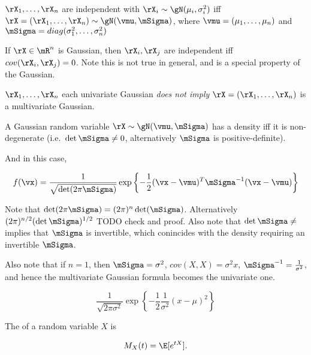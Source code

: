 \begin{rem}
  $\rX_1, \dots, \rX_n$ are independent with $\rX_i \sim \gN(\mu_i,
  \sigma_i^2)$ iff $\rX = (\rX_1, \dots, \rX_n) \sim \gN(\vmu, \mSigma)$,
  where $\vmu = (\mu_1, \dots, \mu_n)$ and $\mSigma = diag(\sigma_1^2, \dots,
  \sigma_n^2)$
\end{rem}

\begin{thm}
  If $\rX \in \mR^n$ is Gaussian, then $\rX_i, \rX_j$ are independent iff
  $cov(\rX_i, \rX_j) = 0$. Note this is not true in general, and is a special
  property of the Gaussian.
\end{thm}

\begin{thm}
  $\rX_1, \dots, \rX_n$ each univariate Gaussian \emph{does not imply} $\rX =
  (\rX_1, \dots, \rX_n)$ is a multivariate Gaussian.
\end{thm}

\begin{thm}
  A Gaussian random variable $\rX \sim \gN(\vmu, \mSigma)$ has a density iff
  it is non-degenerate (i.e.\ $\det \mSigma \neq 0$, alternatively $\mSigma$
  is positive-definite).

  And in this case,

  \begin{equation}
    \label{eq:mvn-definition}
    f(\vx) = \frac{1}{\sqrt{\det(2 \pi \mSigma)}} \exp{ \left\{ - \frac{1}{2}
    (\vx - \vmu)^T \mSigma^{-1} (\vx - \vmu) \right\} }
  \end{equation}

  Note that $\det(2 \pi \mSigma) = (2\pi)^n \det(\mSigma)$. Alternatively $(2
  \pi)^{n/2} (\det \mSigma)^{1/2}$ {TODO check and proof}. Also note that
  $\det \mSigma \neq$ implies that $\mSigma$ is invertible, which conincides
  with the density requiring an invertible $\mSigma$.

  Also note that if $n = 1$, then $\mSigma = \sigma^2$, $cov(X, X) = \sigma^2
  x$, $\mSigma^{-1} = \frac{1}{\sigma^2}$, and hence the multivariate
  Gaussian formula becomes the univariate one.

  \begin{equation}
    \frac{1}{\sqrt{2 \pi \sigma^2}} \exp{\left\{ - \frac{1}{2} \frac{1}{\sigma^2} (x - \mu)^2\right\}}
  \end{equation}
\end{thm}


\begin{defn}
  The  of a random variable $X$ is

  \begin{equation}
    M_X(t) = \E[e^{t X}].
  \end{equation}
\end{defn}

